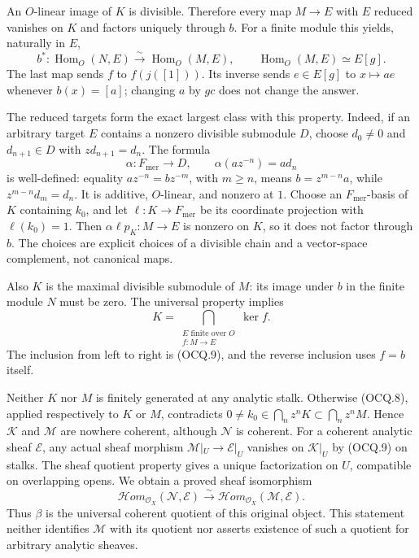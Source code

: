 An $O$-linear image of $K$ is divisible.  Therefore every map $M\to E$
with $E$ reduced vanishes on $K$ and factors uniquely through $b$.
For a finite module this yields, naturally in $E$,
\[
 b^*:\operatorname{Hom}_O(N,E)\xrightarrow{\sim}
       \operatorname{Hom}_O(M,E),\qquad
 \operatorname{Hom}_O(M,E)\simeq E[g].                         \tag{OCQ.9}
\]
The last map sends $f$ to $f(j([1]))$.  Its inverse sends
$e\in E[g]$ to $x\mapsto a e$ whenever $b(x)=[a]$;
changing $a$ by $gc$ does not change the answer.

The reduced targets form the exact largest class with this property.
Indeed, if an arbitrary target $E$ contains a nonzero divisible submodule
$D$, choose $d_0\ne0$ and $d_{n+1}\in D$ with $zd_{n+1}=d_n$.
The formula
\[
 \alpha:F_{\mathrm{mer}}\longrightarrow D,\qquad
          \alpha(az^{-n})=ad_n                               \tag{OCQ.10}
\]
is well-defined: equality $az^{-n}=bz^{-m}$, with $m\ge n$,
means $b=z^{m-n}a$, while $z^{m-n}d_m=d_n$.
It is additive, $O$-linear, and nonzero at $1$.
Choose an $F_{\mathrm{mer}}$-basis of $K$ containing $k_0$, and let
$\ell:K\to F_{\mathrm{mer}}$ be its coordinate projection with
$\ell(k_0)=1$.  Then $\alpha\ell p_K:M\to E$ is nonzero on $K$,
so it does not factor through $b$.  The choices are explicit choices
of a divisible chain and a vector-space complement, not canonical maps.

Also $K$ is the maximal divisible submodule of $M$: its image under $b$
in the finite module $N$ must be zero.  The universal property implies
\[
 K=\bigcap_{\substack{E\text{ finite over }O\\f:M\to E}}
       \ker f.                                                \tag{OCQ.11}
\]
The inclusion from left to right is (OCQ.9), and the reverse inclusion
uses $f=b$ itself.

Neither $K$ nor $M$ is finitely generated at any analytic stalk.
Otherwise (OCQ.8), applied respectively to $K$ or $M$, contradicts
$0\ne k_0\in\bigcap_nz^nK\subset\bigcap_nz^nM$.
Hence $\mathcal K$ and $\mathcal M$ are nowhere coherent, although
$\mathcal N$ is coherent.  For a coherent analytic sheaf $\mathcal E$,
any actual sheaf morphism $\mathcal M|_U\to\mathcal E|_U$ vanishes
on $\mathcal K|_U$ by (OCQ.9) on stalks.  The sheaf quotient property
gives a unique factorization on $U$, compatible on overlapping opens.
We obtain a proved sheaf isomorphism
\[
 \mathcal H om_{\mathcal O_X}(\mathcal N,\mathcal E)
   \xrightarrow{\sim}
 \mathcal H om_{\mathcal O_X}(\mathcal M,\mathcal E).           \tag{OCQ.12}
\]
Thus $\beta$ is the universal coherent quotient of this original object.
This statement neither identifies $\mathcal M$ with its quotient nor
asserts existence of such a quotient for arbitrary analytic sheaves.

